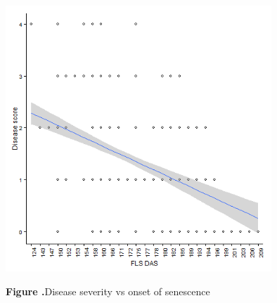 \documentclass{frontiersSCNS} %
\begin{document}
\begin{figure}[h!]
\begin{center}
\includegraphics[width=10cm]{s_d.png}
\end{center}
 \textbf{\label{fig:01} Figure .}{Disease severity vs onset of senescence}
\end{figure}
\end{document}
